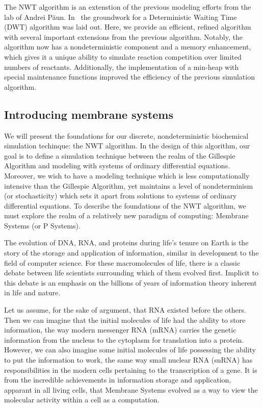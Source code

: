 \documentclass[copyright]{eptcs}
\begin{document}
The NWT algorithm is an extenstion of the previous modeling efforts from the lab
of Andrei P\u aun.  In~\cite{cheruku07} the groundwork for a Deterministic Waiting Time (DWT) algorithm was laid out.  Here, we provide an efficient, refined algorithm with several important extensions from the previous algorithm.  Notably, the algorithm now has a nondeterministic component and a memory enhancement, which gives it a unique ability to simulate reaction competition over limited numbers of reactants.  Additionally, the implementation of a min-heap with special maintenance functions improved the efficiency of the previous simulation algorithm.







\subsection{Introducing membrane systems}\label{intromemsys}

We will present the foundations for our discrete, nondeterministic biochemical simulation techinque: the NWT algorithm.  In the design of this algorithm, our goal is to define a simulation technique between the realm of the Gillespie Algorithm and modeling with systems of ordinary differential equations.  Moreover, we wish to have a modeling technique which is less computationally intensive than the Gillespie Algorithm, yet maintains a level of nondeterminism (or stochasticity) which sets it apart from solutions to systems of ordinary differential equations.  To describe the foundations of the NWT algorithm, we must explore the realm of a relatively new paradigm of computing: Membrane Systems (or P Systems).

The evolution of DNA, RNA, and proteins during life's tenure on Earth is the story of the storage and application of information, similar in development to the field of computer science.  For these macromolecules of life, there is a classic debate between life scientists surrounding which of them evolved first.  Implicit to this debate is an emphasis on the billions of years of information theory inherent in life and nature.

Let us assume, for the sake of argument, that RNA existed before the others.  Then we can imagine that the initial molecules of life had the ability to store information, the way modern messenger RNA (mRNA) carries the genetic information from the nucleus to the cytoplasm for translation into a protein.  However, we can also imagine some initial molecules of life possessing the ability to put the information to work, the same way small nuclear RNA (snRNA) has responsibilities in the modern cells pertaining to the transcription of a gene.  It is from the incredible achievements in information storage and application, apparant in all living cells, that Membrane Systems evolved as a way to view the molecular activity within a cell as a computation.
\end{document}
